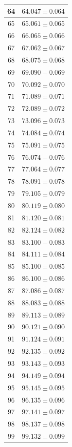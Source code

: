 \documentclass[prb,12pt]{revtex4-2}
\theoremstyle{definition}
\theoremstyle{definition}
\begin{document}
\begin{longtable}{cc}
64 & $64.047\pm 0.064$ \\\midrule
65 & $65.061\pm 0.065$ \\\midrule
66 & $66.065\pm 0.066$ \\\midrule
67 & $67.062\pm 0.067$ \\\midrule
68 & $68.075\pm 0.068$ \\\midrule
69 & $69.090\pm 0.069$ \\\midrule
70 & $70.092\pm 0.070$ \\\midrule
71 & $71.089\pm 0.071$ \\\midrule
72 & $72.089\pm 0.072$ \\\midrule
73 & $73.096\pm 0.073$ \\\midrule
74 & $74.084\pm 0.074$ \\\midrule
75 & $75.091\pm 0.075$ \\\midrule
76 & $76.074\pm 0.076$ \\\midrule
77 & $77.064\pm 0.077$ \\\midrule
78 & $78.091\pm 0.078$ \\\midrule
79 & $79.105\pm 0.079$ \\\midrule
80 & $80.119\pm 0.080$ \\\midrule
81 & $81.120\pm 0.081$ \\\midrule
82 & $82.124\pm 0.082$ \\\midrule
83 & $83.100\pm 0.083$ \\\midrule
84 & $84.111\pm 0.084$ \\\midrule
85 & $85.100\pm 0.085$ \\\midrule
86 & $86.100\pm 0.086$ \\\midrule
87 & $87.086\pm 0.087$ \\\midrule
88 & $88.083\pm 0.088$ \\\midrule
89 & $89.113\pm 0.089$ \\\midrule
90 & $90.121\pm 0.090$ \\\midrule
91 & $91.124\pm 0.091$ \\\midrule
92 & $92.135\pm 0.092$ \\\midrule
93 & $93.143\pm 0.093$ \\\midrule
94 & $94.149\pm 0.094$ \\\midrule
95 & $95.145\pm 0.095$ \\\midrule
96 & $96.135\pm 0.096$ \\\midrule
97 & $97.141\pm 0.097$ \\\midrule
98 & $98.137\pm 0.098$ \\\midrule
99 & $99.132\pm 0.099$ \\\midrule

\end{longtable}
\end{document}
